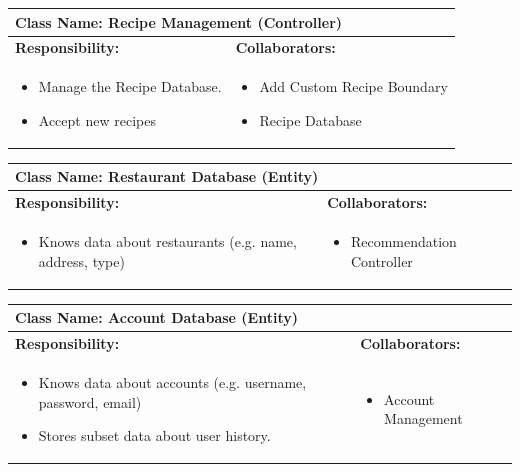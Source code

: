 \documentclass[]{article}
\begin{document}
\begin{table}[H]
	\centering
	\begin{tabular}{|p{7cm}|p{7cm}|}
	\hline 
	 \multicolumn{2}{|l|}{\textbf{Class Name: Recipe Management (Controller)}} \\
	\hline
	\textbf{Responsibility:} & \textbf{Collaborators:} \\
	\hline
	\raggedright
	\begin{itemize}
		\item Manage the Recipe Database.
		\item Accept new recipes
	\end{itemize}
	\vspace{1in} & 
	\begin{itemize}
		\item Add Custom Recipe Boundary
		\item Recipe Database
	\end{itemize} \\
	\hline
	\end{tabular}
\end{table}


\begin{table}[H]
	\centering
	\begin{tabular}{|p{7cm}|p{7cm}|}
	\hline 
	 \multicolumn{2}{|l|}{\textbf{Class Name:} Restaurant Database (Entity) }\\
	\hline
	\textbf{Responsibility:} & \textbf{Collaborators:} \\
	\hline
	\raggedright
	\begin{itemize}
		\item Knows data about restaurants (e.g. name, address, type)
	\end{itemize}
	\vspace{1in} & 
	\begin{itemize}
		\item Recommendation Controller
	\end{itemize} \\
	\hline
	\end{tabular}
\end{table}

\begin{table}[H]
	\centering
	\begin{tabular}{|p{7cm}|p{7cm}|}
	\hline 
	 \multicolumn{2}{|l|}{\textbf{Class Name:} Account Database (Entity) }\\
	\hline
	\textbf{Responsibility:} & \textbf{Collaborators:} \\
	\hline
	\raggedright
	\begin{itemize}
		\item Knows data about accounts (e.g. username, password, email)
		\item Stores subset data about user history.
	\end{itemize}
	\vspace{1in} & 
	\begin{itemize}
		\item Account Management
	\end{itemize} \\
	\hline
	\end{tabular}
\end{table}
\end{document}
